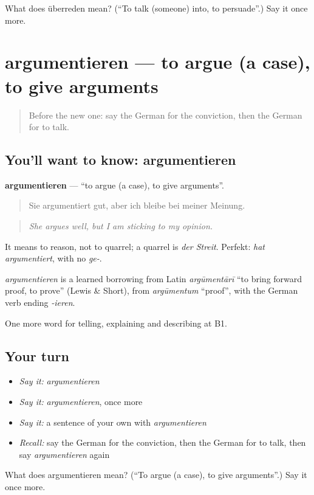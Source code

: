 \begin{tcolorbox}[breakable,colback=teal!4,colframe=teal!35!black,title={Before you move on}]
What does überreden mean? (\textquotedblleft{}To talk (someone) into, to persuade\textquotedblright{}.) Say it once more.
\end{tcolorbox}
\section[argumentieren]{argumentieren — to argue (a case), to give arguments}

\label{lesson:GE-C331-argumentieren}



\begin{quote}
Before the new one: say the German for the conviction, then the German for to talk.
\end{quote}

\subsection*{You'll want to know: argumentieren}
\textbf{argumentieren} — \textquotedblleft{}to argue (a case), to give arguments\textquotedblright{}.

\begin{quote}
Sie argumentiert gut, aber ich bleibe bei meiner Meinung.
\end{quote}

\begin{quote}
\emph{She argues well, but I am sticking to my opinion.}
\end{quote}

It means to reason, not to quarrel; a quarrel is \emph{der Streit}. Perfekt: \emph{hat argumentiert}, with no \emph{ge-}.

\begin{cousinweb}
\emph{argumentieren} is a learned borrowing from Latin \emph{argūmentārī} \textquotedblleft{}to bring forward proof, to prove\textquotedblright{} (Lewis \& Short), from \emph{argūmentum} \textquotedblleft{}proof\textquotedblright{}, with the German verb ending \emph{-ieren}.
\end{cousinweb}

\begin{grammarlens}[title={What you've built}]
One more word for telling, explaining and describing at B1.
\end{grammarlens}

\subsection*{Your turn}
\begin{itemize}
\raggedright
  \item \emph{Say it:} \emph{argumentieren}
  \item \emph{Say it:} \emph{argumentieren}, once more
  \item \emph{Say it:} a sentence of your own with \emph{argumentieren}
  \item \emph{Recall:} say the German for the conviction, then the German for to talk, then say \emph{argumentieren} again
\end{itemize}

\begin{tcolorbox}[breakable,colback=teal!4,colframe=teal!35!black,title={Before you move on}]
What does argumentieren mean? (\textquotedblleft{}To argue (a case), to give arguments\textquotedblright{}.) Say it once more.
\end{tcolorbox}
